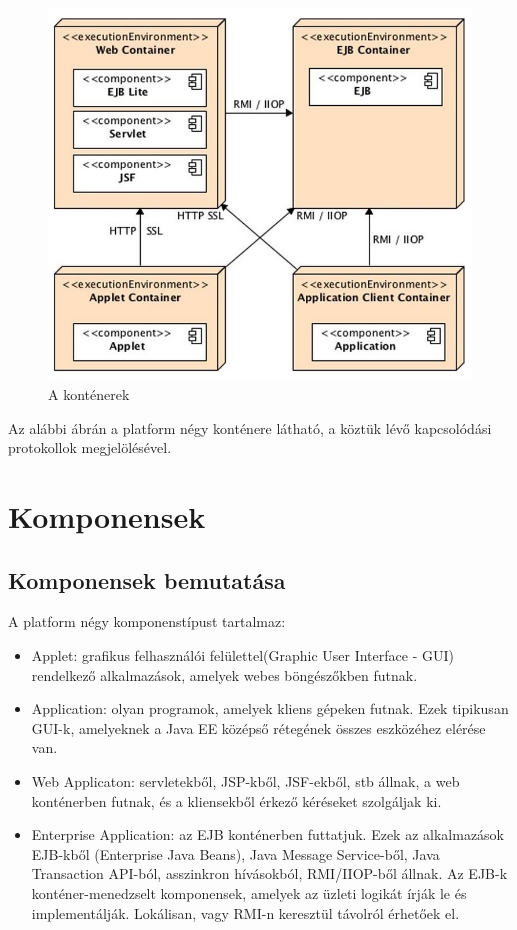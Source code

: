 \documentclass[centeredchapter]{thesis-ekf}
\theoremstyle{definition}
\theoremstyle{remark}
\begin{document}
\hypertarget{figure-kontenerek}{}
\begin{figure}[!h]
	\centering
	\includegraphics[width=14cm]{kontenerek.png}
	\caption{A konténerek}
\end{figure}

Az alábbi ábrán a platform négy konténere látható, a köztük lévő kapcsolódási protokollok megjelölésével.

\newpage

\section{Komponensek}

\subsection{Komponensek bemutatása}
A platform négy komponenstípust tartalmaz:
\begin{itemize}
	\item Applet: grafikus felhasználói felülettel(Graphic User Interface - GUI) rendelkező alkalmazások, amelyek webes böngészőkben futnak.
	
	\item Application: olyan programok, amelyek kliens gépeken futnak. Ezek tipikusan GUI-k, amelyeknek a Java EE középső rétegének összes eszközéhez elérése van.
	
	\item Web Applicaton: servletekből, JSP-kből, JSF-ekből, stb állnak, a web konténerben futnak, és a kliensekből érkező kéréseket szolgáljak ki.
	
	\item Enterprise Application: az EJB konténerben futtatjuk. Ezek az alkalmazások EJB-kből (Enterprise Java Beans), Java Message Service-ből, Java Transaction API-ból, asszinkron hívásokból, RMI/IIOP-ből állnak. Az EJB-k konténer-menedzselt komponensek, amelyek az üzleti logikát írják le és implementálják. Lokálisan, vagy RMI-n keresztül távolról érhetőek el. 
	
\end{itemize} 
\end{document}
